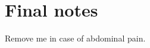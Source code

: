 \documentclass[10pt,chapterheads]{ucsd}
\begin{document}
\appendix
\chapter{Final notes}
  Remove me in case of abdominal pain.





\printindex %
\end{document}
